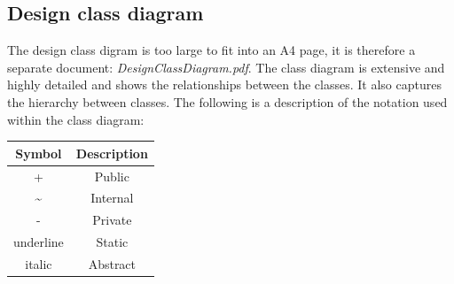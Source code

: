 \documentclass[11pt,a4paper]{article}
\begin{document}
\subsection{Design class diagram}
The design class digram is too large to fit into an A4 page, it is therefore a separate document: \textit{DesignClassDiagram.pdf}. The class diagram is extensive and highly detailed and shows the relationships between the classes. It also captures the hierarchy between classes. The following is a description of the notation used within the class diagram:
\begin{center}
    \begin{tabular}{|c|c|}
        \hline
        \textbf{Symbol} & \textbf{Description} \\
        \hline
        + & Public \\
        \textasciitilde  & Internal \\
        - & Private \\
        underline & Static \\
        italic & Abstract \\
        \hline
    \end{tabular}    
\end{center}
\end{document}
